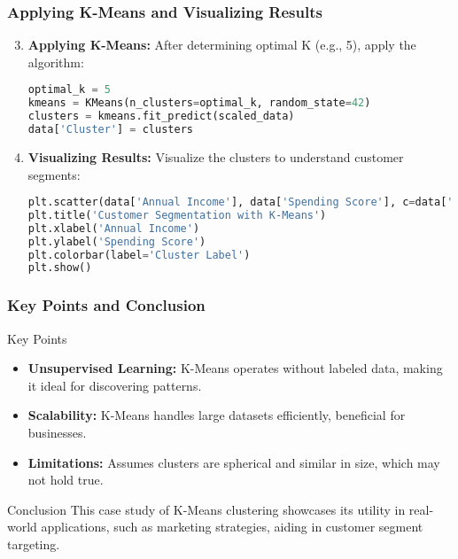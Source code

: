 \documentclass[aspectratio=169]{beamer}
\begin{document}
\begin{frame}[fragile]
    \frametitle{Applying K-Means and Visualizing Results}
    \begin{enumerate}
        \setcounter{enumi}{2}
        \item \textbf{Applying K-Means:} 
        After determining optimal K (e.g., 5), apply the algorithm:
        \begin{lstlisting}[language=Python]
optimal_k = 5
kmeans = KMeans(n_clusters=optimal_k, random_state=42)
clusters = kmeans.fit_predict(scaled_data)
data['Cluster'] = clusters
        \end{lstlisting}

        \item \textbf{Visualizing Results:} 
        Visualize the clusters to understand customer segments:
        \begin{lstlisting}[language=Python]
plt.scatter(data['Annual Income'], data['Spending Score'], c=data['Cluster'], cmap='viridis')
plt.title('Customer Segmentation with K-Means')
plt.xlabel('Annual Income')
plt.ylabel('Spending Score')
plt.colorbar(label='Cluster Label')
plt.show()
        \end{lstlisting}
    \end{enumerate}
\end{frame}

\begin{frame}[fragile]
    \frametitle{Key Points and Conclusion}
    \begin{block}{Key Points}
        \begin{itemize}
            \item \textbf{Unsupervised Learning:} 
            K-Means operates without labeled data, making it ideal for discovering patterns.
            \item \textbf{Scalability:} 
            K-Means handles large datasets efficiently, beneficial for businesses.
            \item \textbf{Limitations:} 
            Assumes clusters are spherical and similar in size, which may not hold true.
        \end{itemize}
    \end{block}
    
    \begin{block}{Conclusion}
        This case study of K-Means clustering showcases its utility in real-world applications, such as marketing strategies, aiding in customer segment targeting.
    \end{block}
\end{frame}
\end{document}
